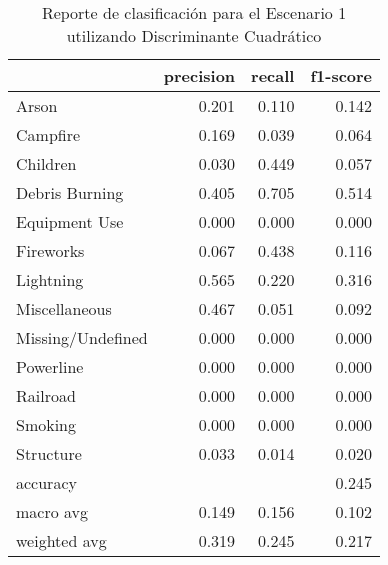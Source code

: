 \begin{table}
\centering
\caption{Reporte de clasificación para el Escenario 1 utilizando Discriminante Cuadrático}
\label{tab:DC_Escenario 1}
\begin{tabular}{lrrr}
\toprule
{} &  precision &  recall &  f1-score \\
\midrule
Arson             &      0.201 &   0.110 &     0.142 \\
Campfire          &      0.169 &   0.039 &     0.064 \\
Children          &      0.030 &   0.449 &     0.057 \\
Debris Burning    &      0.405 &   0.705 &     0.514 \\
Equipment Use     &      0.000 &   0.000 &     0.000 \\
Fireworks         &      0.067 &   0.438 &     0.116 \\
Lightning         &      0.565 &   0.220 &     0.316 \\
Miscellaneous     &      0.467 &   0.051 &     0.092 \\
Missing/Undefined &      0.000 &   0.000 &     0.000 \\
Powerline         &      0.000 &   0.000 &     0.000 \\
Railroad          &      0.000 &   0.000 &     0.000 \\
Smoking           &      0.000 &   0.000 &     0.000 \\
Structure         &      0.033 &   0.014 &     0.020 \\
accuracy          &            &         &     0.245 \\
macro avg         &      0.149 &   0.156 &     0.102 \\
weighted avg      &      0.319 &   0.245 &     0.217 \\
\bottomrule
\end{tabular}
\end{table}
